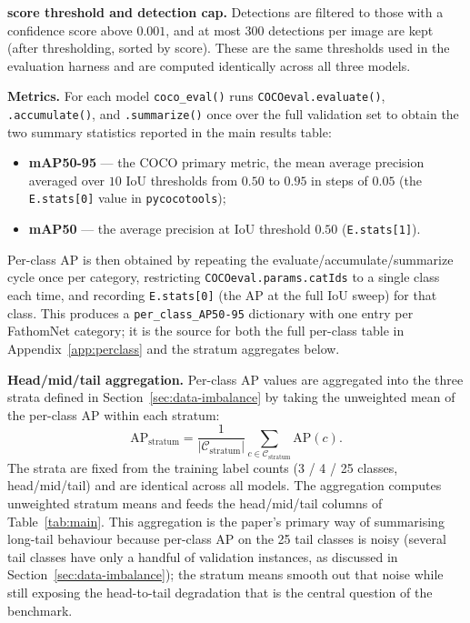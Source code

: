 \documentclass[11pt,a4paper,twocolumn]{article}
\begin{document}
\textbf{score threshold and detection cap.} Detections are filtered to those with
a confidence score above $0.001$, and at most $300$ detections per image are kept
(after thresholding, sorted by score). These are the same thresholds used in the
evaluation harness and are computed identically across all three models.

\textbf{Metrics.} For each model \texttt{coco\_eval()} runs
\texttt{COCOeval.evaluate()}, \texttt{.accumulate()}, and \texttt{.summarize()}
once over the full validation set to obtain the two summary statistics reported in
the main results table:
\begin{itemize}
  \item \textbf{mAP50-95} --- the COCO primary metric, the mean average precision
        averaged over $10$ IoU thresholds from $0.50$ to $0.95$ in steps of $0.05$
        (the \texttt{E.stats[0]} value in \texttt{pycocotools});
  \item \textbf{mAP50} --- the average precision at IoU threshold $0.50$
        (\texttt{E.stats[1]}).
\end{itemize}
Per-class AP is then obtained by repeating the evaluate/accumulate/summarize cycle
once per category, restricting \texttt{COCOeval.params.catIds} to a single class
each time, and recording \texttt{E.stats[0]} (the AP at the full IoU sweep) for
that class. This produces a \texttt{per\_class\_AP50-95} dictionary with one entry
per FathomNet category; it is the source for both the full per-class table in
Appendix~\ref{app:perclass} and the stratum aggregates below.

\textbf{Head/mid/tail aggregation.} Per-class AP values are aggregated into the
three strata defined in Section~\ref{sec:data-imbalance} by taking the unweighted
mean of the per-class AP within each stratum:
\[
\mathrm{AP}_{\mathrm{stratum}} = \frac{1}{|\mathcal{C}_{\mathrm{stratum}}|}
\sum_{c \in \mathcal{C}_{\mathrm{stratum}}} \mathrm{AP}(c).
\]
The strata are fixed from the training label counts (3 / 4 / 25 classes,
head/mid/tail) and are identical across all models. The aggregation computes unweighted stratum means and feeds the
head/mid/tail columns of Table~\ref{tab:main}. This aggregation is the paper's
primary way of summarising long-tail behaviour because per-class AP on the 25 tail
classes is noisy (several tail classes have only a handful of validation instances,
as discussed in Section~\ref{sec:data-imbalance}); the stratum means smooth out
that noise while still exposing the head-to-tail degradation that is the central
question of the benchmark.
\end{document}
